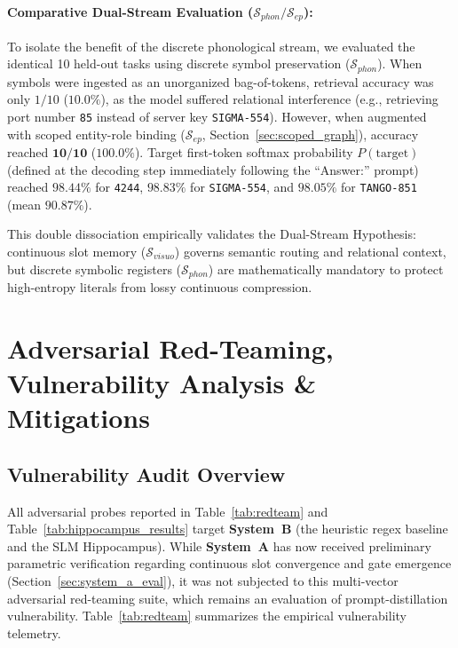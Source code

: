 \documentclass[11pt,a4paper]{article}
\begin{document}
\paragraph{Comparative Dual-Stream Evaluation ($\mathcal{S}_{phon} / \mathcal{S}_{ep}$):}
To isolate the benefit of the discrete phonological stream, we evaluated the identical 10 held-out tasks using discrete symbol preservation ($\mathcal{S}_{phon}$). When symbols were ingested as an unorganized bag-of-tokens, retrieval accuracy was only $1/10$ ($10.0\%$), as the model suffered relational interference (e.g., retrieving port number \texttt{85} instead of server key \texttt{SIGMA-554}). However, when augmented with scoped entity-role binding ($\mathcal{S}_{ep}$, Section~\ref{sec:scoped_graph}), accuracy reached $\mathbf{10/10}$ ($\mathbf{100.0\%}$). Target first-token softmax probability $P(\text{target})$ (defined at the decoding step immediately following the ``Answer:'' prompt) reached $98.44\%$ for \texttt{4244}, $98.83\%$ for \texttt{SIGMA-554}, and $98.05\%$ for \texttt{TANGO-851} (mean $90.87\%$).

This double dissociation empirically validates the Dual-Stream Hypothesis: continuous slot memory ($\mathcal{S}_{visuo}$) governs semantic routing and relational context, but discrete symbolic registers ($\mathcal{S}_{phon}$) are mathematically mandatory to protect high-entropy literals from lossy continuous compression.

\section{Adversarial Red-Teaming, Vulnerability Analysis \& Mitigations}
\label{sec:adversarial}

\subsection{Vulnerability Audit Overview}
All adversarial probes reported in Table~\ref{tab:redteam} and Table~\ref{tab:hippocampus_results} target \textbf{System~B} (the heuristic regex baseline and the SLM Hippocampus). While \textbf{System~A} has now received preliminary parametric verification regarding continuous slot convergence and gate emergence (Section~\ref{sec:system_a_eval}), it was not subjected to this multi-vector adversarial red-teaming suite, which remains an evaluation of prompt-distillation vulnerability. Table~\ref{tab:redteam} summarizes the empirical vulnerability telemetry.
\end{document}
